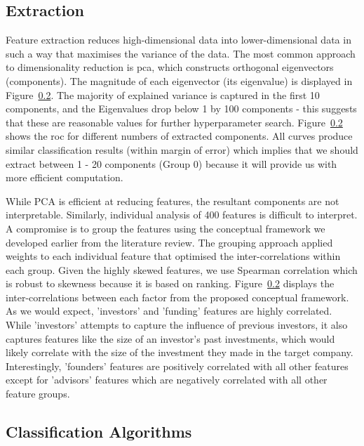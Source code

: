 \documentclass[../thesis/thesis.tex]{subfiles}
\begin{document}
\subsection{Extraction}

Feature extraction reduces high-dimensional data into lower-dimensional data in such a way that maximises the variance of the data. The most common approach to dimensionality reduction is \gls{pca}, which constructs orthogonal eigenvectors (components). The magnitude of each eigenvector (its eigenvalue) is displayed in Figure~\ref{}. The majority of explained variance is captured in the first 10 components, and the Eigenvalues drop below 1 by 100 components - this suggests that these are reasonable values for further hyperparameter search. Figure~\ref{} shows the \gls{roc} for different numbers of extracted components. All curves produce similar classification results (within margin of error) which implies that we should extract between 1 - 20 components (Group 0) because it will provide us with more efficient computation.



While PCA is efficient at reducing features, the resultant components are not interpretable. Similarly, individual analysis of 400\+ features is difficult to interpret. A compromise is to group the features using the conceptual framework we developed earlier from the literature review. The grouping approach applied weights to each individual feature that optimised the inter-correlations within each group. Given the highly skewed features, we use Spearman correlation which is robust to skewness because it is based on ranking. Figure~\ref{} displays the inter-correlations between each factor from the proposed conceptual framework. As we would expect, 'investors' and 'funding' features are highly correlated. While 'investors' attempts to capture the influence of previous investors, it also captures features like the size of an investor's past investments, which would likely correlate with the size of the investment they made in the target company. Interestingly, 'founders' features are positively correlated with all other features except for 'advisors' features which are negatively correlated with all other feature groups.


\subsection{Classification Algorithms}
\end{document}
